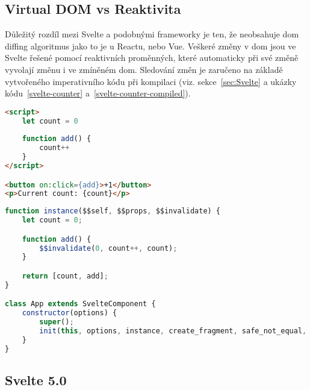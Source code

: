 \subsection{Virtual DOM vs Reaktivita}

Důležitý rozdíl mezi Svelte a podobnými frameworky je ten, že neobsahuje \gls{dom} diffing algoritmus jako to je u Reactu, nebo Vue.
Veškeré změny v \gls{dom} jsou ve Svelte řešené pomocí reaktivních proměnných, které automaticky při své změně vyvolají změnu i ve zmíněném \gls{dom}.
Sledování změn je zaručeno na základě vytvořeného imperativního kódu při kompilaci (viz. sekce~\ref{sec:Svelte} a ukázky kódu~\ref{svelte-counter} a~\ref{svelte-counter-compiled}).

\begin{lstlisting}[caption={Počítadlo ve Svelte}, label={svelte-counter}, language=html]
<script>
	let count = 0
	
	function add() {
		count++
	}
</script>

<button on:click={add}>+1</button>
<p>Current count: {count}</p>
\end{lstlisting}

\begin{lstlisting}[caption={Počítadlo po kompilaci}, label={svelte-counter-compiled}, language=JavaScript]
function instance($$self, $$props, $$invalidate) {
    let count = 0;

    function add() {
        $$invalidate(0, count++, count);
    }

    return [count, add];
}

class App extends SvelteComponent {
    constructor(options) {
        super();
        init(this, options, instance, create_fragment, safe_not_equal, {});
    }
}
\end{lstlisting}

\subsection{Svelte 5.0}
